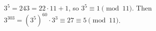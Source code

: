 $3^5=243=22\cdot11+1$, so $3^5\equiv1\pmod{11}$. Then $3^{303}=\left(3^5\right)^{60}\cdot3^3\equiv27\equiv\boxed{5}\pmod{11}$.
